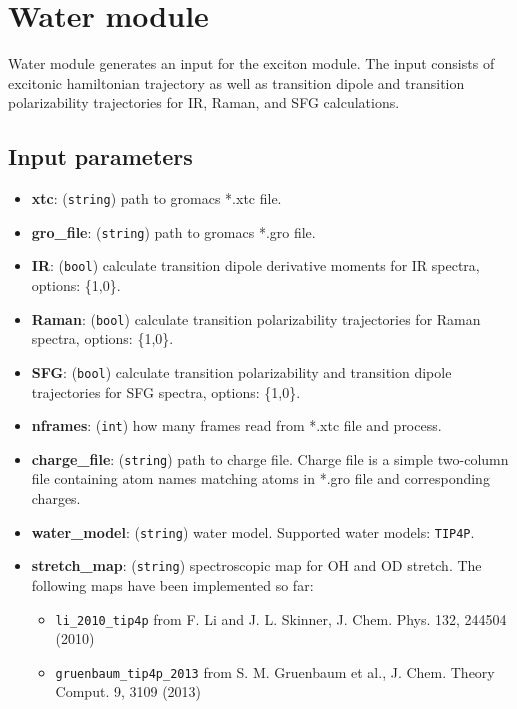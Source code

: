 \documentclass{article}
\begin{document}
\section{Water module}
Water module generates an input for the exciton module. The input consists of excitonic hamiltonian trajectory as well as 
transition dipole and transition polarizability trajectories for IR, Raman, and SFG calculations.

\subsection{Input parameters}

\begin{itemize}

\item \textbf{xtc}: (\texttt{string}) path to gromacs *.xtc file.
\item \textbf{gro\_file}: (\texttt{string}) path to gromacs *.gro file.
\item \textbf{IR}: (\texttt{bool}) calculate transition dipole derivative moments for IR spectra, options: \{1,0\}.
\item \textbf{Raman}: (\texttt{bool}) calculate transition polarizability trajectories for Raman spectra, options: \{1,0\}.
\item \textbf{SFG}: (\texttt{bool}) calculate transition polarizability and transition dipole trajectories for SFG spectra, options: \{1,0\}.
\item \textbf{nframes}: (\texttt{int}) how many frames read from *.xtc file and process.
\item \textbf{charge\_file}: (\texttt{string}) path to charge file. Charge file is a simple two-column file containing atom names matching atoms in 
*.gro file and corresponding charges.
\item \textbf{water\_model}: (\texttt{string}) water model. Supported water models: \texttt{TIP4P}.
\item \textbf{stretch\_map}: (\texttt{string}) spectroscopic map for OH and OD stretch. The following maps have been implemented so far:
\begin{itemize}
\item \texttt{li\_2010\_tip4p} from F. Li and J. L. Skinner, J. Chem. Phys. 132, 244504 (2010) 
\item  \texttt{gruenbaum\_tip4p\_2013} from S. M. Gruenbaum et al., J. Chem. Theory Comput. 9, 3109 (2013)
\end{itemize}


\end{itemize}
\end{document}
